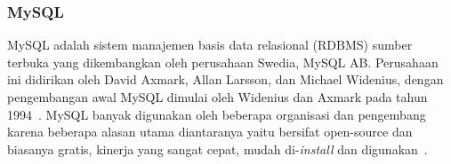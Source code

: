 \subsubsection{MySQL}
MySQL adalah sistem manajemen basis data relasional (RDBMS) sumber terbuka yang dikembangkan oleh perusahaan Swedia, MySQL AB. Perusahaan ini didirikan oleh David Axmark, Allan Larsson, dan Michael Widenius, dengan pengembangan awal MySQL dimulai oleh Widenius dan Axmark pada tahun 1994~\cite{masteringmysql2022sufyan}. MySQL banyak digunakan oleh beberapa organisasi dan pengembang karena beberapa alasan utama diantaranya yaitu bersifat open-source dan biasanya gratis, kinerja yang sangat cepat, mudah di-\textit{install} dan digunakan~\cite{mysql2023ben}.
